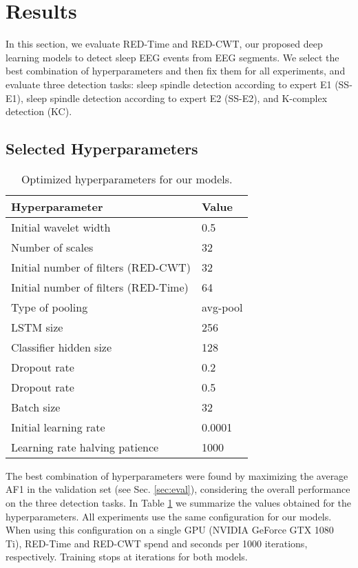 \documentclass[conference]{IEEEtran}
\begin{document}
\section{Results}
In this section, we evaluate RED-Time and RED-CWT, our proposed deep learning models to detect sleep EEG events from EEG segments. We select the best combination of hyperparameters and then fix them for all experiments, and evaluate three detection tasks: sleep spindle detection according to expert E1 (SS-E1), sleep spindle detection according to expert E2 (SS-E2), and K-complex detection (KC).


\subsection{Selected Hyperparameters}
\label{sec:result_hyper}

\begin{table}[tbp]
\centering
\caption{Optimized hyperparameters for our models.}
\label{tab:hyper}
\begin{tabular}{ll}
    \toprule
    Hyperparameter  & Value \\
    \midrule
Initial wavelet width  & 0.5\\
    Number of scales  & 32\\
    Initial number of filters  (RED-CWT) & 32\\
    Initial number of filters  (RED-Time) & 64\\
    Type of pooling & avg-pool\\
    LSTM size  & 256 \\
    Classifier hidden size  & 128 \\
    Dropout rate  & 0.2 \\
    Dropout rate  & 0.5 \\
    Batch size  & 32\\
    Initial learning rate  & 0.0001\\
    Learning rate halving patience  & 1000\\
\bottomrule
\end{tabular}
 \end{table}

The best combination of hyperparameters were found by maximizing the average AF1 in the validation set (see Sec. \ref{sec:eval}), considering the overall performance on the three detection tasks. In Table \ref{tab:hyper} we summarize the values obtained for the hyperparameters. All experiments use the same configuration for our models. When using this configuration on a single GPU (NVIDIA GeForce GTX 1080 Ti), RED-Time and RED-CWT spend  and  seconds per 1000 iterations, respectively. Training stops at  iterations for both models.
\end{document}
